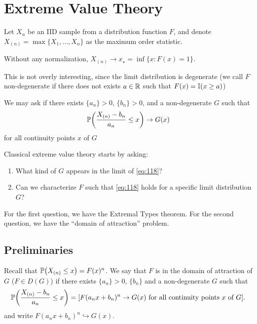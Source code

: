 
\chapter{Extreme Value Theory}
\label{cha:extreme-value-theory}

Let $X_{n}$ be an IID sample from a distribution function $F$, and
denote $X_{(n)} = \max \{ X_{1}, \dots, X_{n} \}$ as the maximum order
statistic.

Without any normalization, $X_{(n)} \rightarrow x_{\star} = \inf \{ x:
F(x) = 1 \}$.

This is not overly interesting, since the limit distribution is
degenerate (we call $F$ non-degenerate if there does not exists $a \in
\mathbb{R}$ such that $F(x) = \I{x \geq a}$)

We may ask if there exists $\{ a_{n} \} > 0$, $\{ b_{n} \} > 0$, and a
non-degenerate $G$ such that
\begin{equation}
  \label{eq:118}
  \Prob{\frac{X_{(n)} - b_{n}}{a_{n}} \leq x} \rightarrow G(x)
\end{equation} for all continuity points $x$ of $G$

Classical extreme value theory starts by asking:
\begin{enumerate}
\item What kind of $G$ appears in the limit of \eqref{eq:118}?
\item Can we characterize $F$ such that \eqref{eq:118} holds for a
  specific limit distribution $G$?
\end{enumerate}

For the first question, we have the Extremal Types theorem. For the
second question, we have the ``domain of attraction'' problem.


\section{Preliminaries}
\label{sec:prelimiaries}

Recall that $\Prob{X_{(n)} \leq x} = F(x)^{n}$.  We say that $F$ is in
the domain of attraction of $G$ ($F \in D(G)$) if there exists $\{ a_{n} \} > 0$, $\{
b_{n} \} $ and a non-degenerate $G$ such that
\begin{equation}
  \label{eq:119}
  \Prob{\frac{X_{(n)} - b_{n}}{a_{n}} \leq x} = [\text{$F(a_{n} x +
    b_{n})^{n} \rightarrow G(x)$ for all continuity points $x$ of $G$}].
\end{equation} and write $F(a_{n} x + b_{n})^{n} \hookrightarrow G(x)$.

